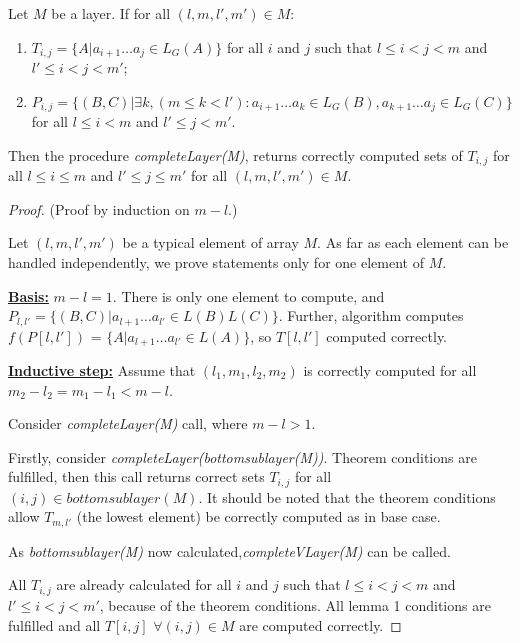 \begin{theorem}
Let $M$ be a layer. If for all $(l, m, l', m') \in M$:
\begin{enumerate}
  \item $T_{i, j} = \{ A |  a_{i + 1} \dots a_{j} \in L_G(A)\}$ for all $i$ and $j$ such that $l \leq i < j < m$ and $l' \leq i < j < m'$;
  \item $P_{i, j} =  \{ (B, C) |\exists k, (m \le k < l'): a_{i + 1} \dots a_{k} \in L_G(B), a_{k + 1} \dots a_{j} \in L_G(C)\}$ for all $l \leq i < m$ and $l' \leq j < m'$.
\end{enumerate}

Then the procedure \textit{completeLayer(M)}, returns correctly computed sets of $T_{i, j}$ for all $l \leq i \le m$ and $l' \leq j \le m'$ for all $(l, m, l', m') \in M$.
\end{theorem}


\begin{proof}(Proof by induction on $m - l$.)

Let $(l, m, l', m')$ be a typical element of array $M$.
As far as each element can be handled independently, we prove statements only for one element of $M$.

\underline{\textbf{Basis:}} $m - l = 1$. There is only one element to compute, and $P_{l, l'} =  \{ (B, C) |  a_{l + 1} \dots a_{l'} \in L(B)L(C)\}$. Further, algorithm computes $f(P[l, l'])$ = \linebreak $\{ A |  a_{l + 1} \dots a_{l'} \in L(A)\}$, so $T[l, l']$ computed correctly.

\underline{\textbf{Inductive step:}} Assume that $(l_1, m_1, l_2, m_2)$ is correctly computed for all $m_2 - l_2 = m_1 - l_1 < m - l$.

Consider \textit{completeLayer(M)} call, where $m - l > 1$.

Firstly, consider \textit{completeLayer(bottomsublayer(M))}.
Theorem conditions are fulfilled, then this call returns correct sets $T_{i, j}$ for all $(i, j) \in bottomsublayer(M)$. It should be noted that the theorem conditions allow $T_{m, l'}$ (the lowest element) be correctly computed as in base case.

As \textit{bottomsublayer(M)} now calculated,\textit{completeVLayer(M)} can be called.

All $T_{i,j}$ are already calculated for all $i$ and $j$ such that $l \leq i < j < m$ and $l' \leq i < j < m'$, because of the theorem conditions.  All lemma 1 conditions are fulfilled and all $T[i, j]$ $\forall (i, j) \in M$ are computed correctly.
\end{proof}

